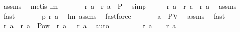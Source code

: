 \begin{isabellebody}
\ assms\ \isamarkupfalse%
\ {\isacharparenleft}metis\ lm{}{}{\isacharparenright}\isanewline
\ \ \isamarkupfalse%
\ \isamarkupfalse%
\ \isamarkupfalse%
\ {\isachardoublequoteopen}{\isacharparenleft}{\isacharquery}r\ a{}\ {\isasymunion}\ {\isacharquery}r\ a{}{\isacharparenright}\ {\isasymin}\ {\isacharquery}P{\isachardoublequoteclose}\ \isamarkupfalse%
\ simp\isanewline
\ \ \isamarkupfalse%
\ \isamarkupfalse%
\ {\isachardoublequoteopen}{\isacharquery}r\ {\isacharquery}a\ {\isacharequal}\ {\isacharparenleft}{\isacharquery}r\ a{}\ {\isasymunion}\ {\isacharquery}r\ a{}{\isacharparenright}{\isachardoublequoteclose}\ \isamarkupfalse%
\ assms\ \isamarkupfalse%
\ fast\isanewline
\ \ \isamarkupfalse%
\ \isamarkupfalse%
\ \isamarkupfalse%
\ {\isachardoublequoteopen}{\isacharquery}p\ {\isacharparenleft}{\isacharquery}r\ {\isacharquery}a{\isacharparenright}{\isachardoublequoteclose}\ \isamarkupfalse%
\ lm{}{}\ assms\ \isamarkupfalse%
\ fastforce\isanewline
\ \ \isamarkupfalse%
\ \isamarkupfalse%
\ \isamarkupfalse%
\ {\isachardoublequoteopen}{\isacharquery}a\ {\isasymin}\ {\isacharquery}PV{\isachardoublequoteclose}\ \isamarkupfalse%
\ assms\ \isamarkupfalse%
\ fast\isanewline
\ \ \isamarkupfalse%
\ \isamarkupfalse%
\ {\isachardoublequoteopen}{\isacharquery}r\ a{}\ {\isasyminter}\ {\isacharparenleft}{\isacharquery}r\ a{}{\isacharparenright}\ {\isasymsubseteq}\ Pow\ {\isacharparenleft}{\isasymUnion}\ {\isacharparenleft}{\isacharquery}r\ a{}{\isacharparenright}\ {\isasyminter}\ {\isacharparenleft}{\isasymUnion}\ {\isacharparenleft}{\isacharquery}r\ a{}{\isacharparenright}{\isacharparenright}{\isacharparenright}{\isachardoublequoteclose}\ \isamarkupfalse%
\ auto\isanewline
\ \ \isamarkupfalse%
\ \isamarkupfalse%
\ \isamarkupfalse%
\ {\isachardoublequoteopen}{\isacharbraceleft}{\isacharbraceright}\ {\isasymnotin}\ {\isacharparenleft}{\isacharquery}r\ a{}{\isacharparenright}\ {\isacharampersand}\ {\isacharbraceleft}{\isacharbraceright}\ {\isasymnotin}\ {\isacharparenleft}{\isacharquery}r\ a{}{\isacharparenright}{\isachardoublequoteclose}\ \isamarkupfalse%

\end{isabellebody}
